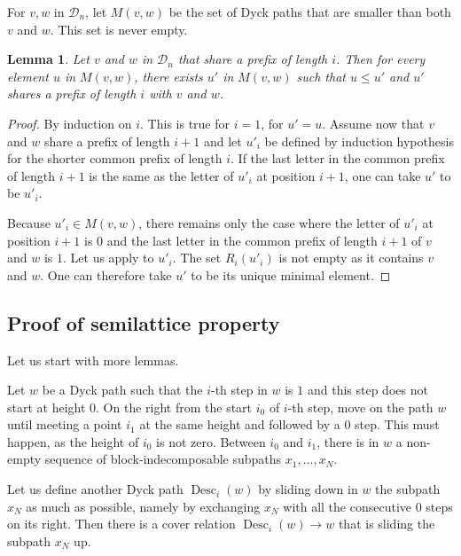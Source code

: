 \documentclass[10pt]{article}
\newtheorem{lemma}[lemma]{Lemma}
\theoremstyle{definition}
\newcommand{\Dyck}{\mathscr{D}}
\DeclareMathOperator{\des}{Desc}
\begin{document}
%

For $v,w$ in $\Dyck_n$, let $M(v,w)$ be the set of Dyck paths that are
smaller than both $v$ and $w$. This set is never empty.

\begin{lemma}
  \label{meet_with_prefix}
  Let $v$ and $w$ in $\Dyck_n$ that share a prefix of length $i$. Then
  for every element $u$ in $M(v,w)$, there exists $u'$ in $M(v,w)$
  such that $u \leq u'$ and $u'$ shares a prefix of length $i$ with $v$
  and $w$.
\end{lemma}
\begin{proof}
  By induction on $i$. This is true for $i=1$, for $u'=u$. Assume now
  that $v$ and $w$ share a prefix of length $i+1$ and let $u'_i$
  be defined by induction hypothesis for the shorter common prefix of
  length $i$. If the last letter in the common prefix of length $i+1$
  is the same as the letter of $u'_i$ at position $i+1$, one can take
  $u'$ to be $u'_i$.

  Because $u'_i \in M(v,w)$, there remains only the case where the
  letter of $u'_i$ at position $i+1$ is $0$ and the last letter in the
  common prefix of length $i+1$ of $v$ and $w$ is $1$. Let us apply
   to $u'_i$. The set $R_{i}(u'_i)$ is not empty as
  it contains $v$ and $w$. One can therefore take $u'$ to be its unique
  minimal element.
\end{proof}

\subsection{Proof of semilattice property}

\label{proof_semi}

Let us start with more lemmas.

Let $w$ be a Dyck path such that the $i$-th step in $w$ is $1$ and
this step does not start at height $0$.  On the right from the start
$i_0$ of $i$-th step, move on the path $w$ until meeting a point $i_1$
at the same height and followed by a $0$ step. This must happen, as
the height of $i_0$ is not zero. Between $i_0$ and $i_1$, there is in
$w$ a non-empty sequence of block-indecomposable subpaths $x_1, \dots, x_N$.

Let us define another Dyck path $\des_i(w)$ by sliding down in $w$ the
subpath $x_N$ as much as possible, namely by exchanging $x_N$ with all
the consecutive $0$ steps on its right. Then there is a cover relation
$\des_i(w) \to w$ that is sliding the subpath $x_N$ up.
\end{document}
